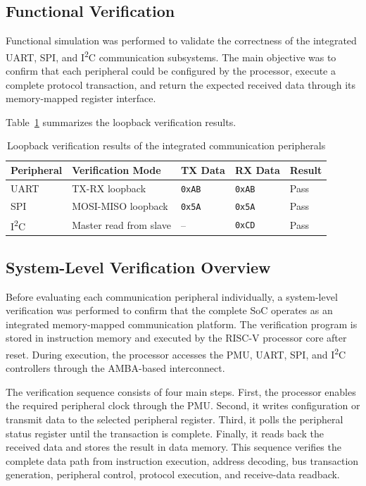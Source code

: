 \documentclass[runningheads]{llncs}
\begin{document}
\subsection{Functional Verification}

Functional simulation was performed to validate the correctness of the integrated UART, SPI, and I\textsuperscript{2}C communication subsystems. The main objective was to confirm that each peripheral could be configured by the processor, execute a complete protocol transaction, and return the expected received data through its memory-mapped register interface.

Table~\ref{tab:loopback_results} summarizes the loopback verification results.

\begin{table}
\caption{Loopback verification results of the integrated communication peripherals}
\label{tab:loopback_results}
\centering
\begin{tabular}{lllll}
\hline
Peripheral & Verification Mode & TX Data & RX Data & Result\\
\hline
UART & TX-RX loopback & \texttt{0xAB} & \texttt{0xAB} & Pass\\
SPI & MOSI-MISO loopback & \texttt{0x5A} & \texttt{0x5A} & Pass\\
I\textsuperscript{2}C & Master read from slave & -- & \texttt{0xCD} & Pass\\
\hline
\end{tabular}
\end{table}

\subsection{System-Level Verification Overview}

Before evaluating each communication peripheral individually, a system-level verification was performed to confirm that the complete SoC operates as an integrated memory-mapped communication platform. The verification program is stored in instruction memory and executed by the RISC-V processor core after reset. During execution, the processor accesses the PMU, UART, SPI, and I\textsuperscript{2}C controllers through the AMBA-based interconnect.

The verification sequence consists of four main steps. First, the processor enables the required peripheral clock through the PMU. Second, it writes configuration or transmit data to the selected peripheral register. Third, it polls the peripheral status register until the transaction is complete. Finally, it reads back the received data and stores the result in data memory. This sequence verifies the complete data path from instruction execution, address decoding, bus transaction generation, peripheral control, protocol execution, and receive-data readback.
\end{document}

